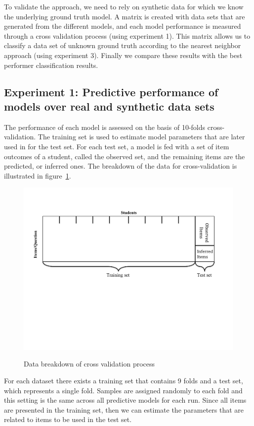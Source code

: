 \begin{enumerate}
\begin{itemize}
To validate the approach, we need to rely on synthetic data for which we know the underlying ground truth model.  A matrix is created with data sets that are generated from the different models, and each model performance is measured through a cross validation process (using experiment 1). This matrix allows us to classify a data set of unknown ground truth according to the nearest neighbor approach (using experiment 3). Finally we compare these results with the best performer classification results.

\end{itemize}
\end{enumerate}

\subsection{Experiment 1: Predictive performance of models over real and synthetic data sets}
\label{Exp1:NO}
The performance of each model is assessed on the basis of 10-folds cross-validation.  The training set is used to estimate model parameters that are later used in for the test set. For each test set, a model is fed with a set of item outcomes of a student, called the observed set, and the remaining items are the predicted, or inferred ones. The breakdown of the data for cross-validation is illustrated in figure~\ref{figMethod}. 

\begin{figure}[h]
\centering
{\includegraphics[trim=1cm 9cm 2.4cm 2.4cm,clip=true,width=.7\textwidth]{images/Methodology.pdf}}
\caption{Data breakdown of cross validation process}
\label{figMethod}
\end{figure}


For each dataset there exists a training set that contains 9 folds and a test set, which represents a single fold. Samples are assigned randomly to each fold and this setting is the same across all predictive models for each run. Since all items are presented in the training set, then we can estimate the parameters that are related to items to be used in the test set. 

